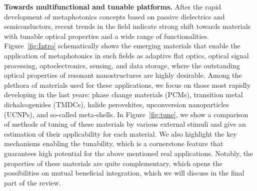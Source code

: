 \documentclass[journal=chreay,manuscript=review]{achemso}
\begin{document}
{\bf Towards multifunctional and tunable platforms.} After the rapid development of metaphotonics concepts based on passive dielectrics and semiconductors, recent trends in the field indicate strong shift towards materials with tunable optical properties and a wide range of functionalities. Figure~\ref{fig:Intro}  schematically shows the emerging materials that enable the application of metaphotonics in such fields as adaptive flat optics, optical signal processing, optoelectronics, sensing, and data storage, where the outstanding optical properties of resonant nanostructures are highly desirable. Among the plethora of materials used for these applications, we focus on those most rapidly developing in the last years: phase change materials (PCMs), transition metal dichalcogenides (TMDCs), halide perovskites, upconversion nanoparticles (UCNPs), and so-called meta-shells. In Figure~\ref{fig:tune}, we show a comparison of methods of tuning of these materials by various external stimuli and give an estimation of their applicability for each material. We also highlight the key mechanisms enabling the tunability, which is a cornerstone feature that guarantees high potential for the above mentioned real applications. Notably, the properties of these materials are quite complementary, which opens the possibilities on mutual beneficial integration, which we will discuss in the final part of the review.
\end{document}
